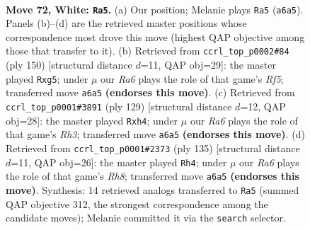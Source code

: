 \documentclass[11pt]{article}
\begin{document}
\clearpage

\begin{figure}[p]\centering
\begin{subfigure}{0.46\textwidth}\centering
\resizebox{\linewidth}{!}{%
\newchessgame
\chessboard[
  setfen={2n1k3/8/R7/8/p6r/P6p/7K/8 w - - 2 72},
  showmover=false,
  pgfstyle=straightmove, color=movearrow, markmove={a6-a5}
]}
\caption{}
\end{subfigure}\hfill
\begin{subfigure}{0.46\textwidth}\centering
\resizebox{\linewidth}{!}{%
\newchessgame
\chessboard[
  setfen={8/4k3/2r5/5Rp1/6P1/8/2p5/2K5 w - - 0 76},
  showmover=false,
  pgfstyle=straightmove, color=movearrow, markmove={f5-g5}
]}
\caption{}
\end{subfigure}
\\[4pt]
\begin{subfigure}{0.46\textwidth}\centering
\resizebox{\linewidth}{!}{%
\newchessgame
\chessboard[
  setfen={k7/P5R1/7r/8/7P/2p5/2K5/8 b - - 5 65},
  showmover=false,
  pgfstyle=straightmove, color=movearrow, markmove={h6-h4}
]}
\caption{}
\end{subfigure}\hfill
\begin{subfigure}{0.46\textwidth}\centering
\resizebox{\linewidth}{!}{%
\newchessgame
\chessboard[
  setfen={8/8/4k3/4P1RP/8/4K3/8/7r b - - 2 68},
  showmover=false,
  pgfstyle=straightmove, color=movearrow, markmove={h1-h4}
]}
\caption{}
\end{subfigure}
\caption{\textbf{Move 72, White: \texttt{Ra5}.} (a) Our position; Melanie plays \texttt{Ra5} (\texttt{a6a5}). Panels (b)--(d) are the retrieved master positions whose correspondence most drove this move (highest QAP objective among those that transfer to it). (b) Retrieved from \texttt{ccrl\_top\_p0002\#84} (ply 150) [structural distance $d$=11, QAP obj=29]: the master played \texttt{Rxg5}; under $\mu$ our \emph{Ra6} plays the role of that game's \emph{Rf5}; transferred move \texttt{a6a5} \textbf{(endorses this move)}. (c) Retrieved from \texttt{ccrl\_top\_p0001\#3891} (ply 129) [structural distance $d$=12, QAP obj=28]: the master played \texttt{Rxh4}; under $\mu$ our \emph{Ra6} plays the role of that game's \emph{Rh3}; transferred move \texttt{a6a5} \textbf{(endorses this move)}. (d) Retrieved from \texttt{ccrl\_top\_p0001\#2373} (ply 135) [structural distance $d$=11, QAP obj=26]: the master played \texttt{Rh4}; under $\mu$ our \emph{Ra6} plays the role of that game's \emph{Rh8}; transferred move \texttt{a6a5} \textbf{(endorses this move)}. Synthesis: 14 retrieved analogs transferred to \texttt{Ra5} (summed QAP objective 312, the strongest correspondence among the candidate moves); Melanie committed it via the \texttt{search} selector.}
\label{fig:thought-m142}
\end{figure}
\end{document}
